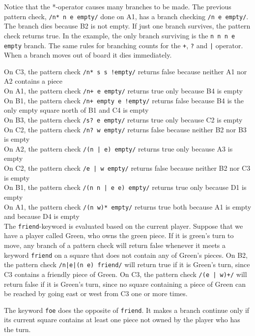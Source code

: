 Notice that the *-operator causes many branches to be made. The previous pattern check, \texttt{/n* n e empty/} done on A1, has a branch checking \texttt{/n e empty/}. The branch dies because B2 is not empty. If just one branch survives, the pattern check returns true. In the example, the only branch surviving is the \texttt{n n n e empty} branch. The same rules for branching counts for the \texttt{+}, \texttt{?} and \texttt{|} operator. When a branch moves out of board it dies immediately.

On C3, the pattern check \texttt{/n* s s !empty/} returns false because neither A1 nor A2 contains a piece\\
On A1, the pattern check \texttt{/n+ e empty/} returns true only because B4 is empty\\
On B1, the pattern check \texttt{/n+ empty e !empty/} returns false because B4 is the only empty square north of B1 and C4 is empty\\
On B3, the pattern check \texttt{/s? e empty/} returns true only because C2 is empty\\
On C2, the pattern check \texttt{/n? w empty/} returns false because neither B2 nor B3 is empty\\
On A2, the pattern check \texttt{/(n | e) empty/} returns true only because A3 is empty\\
On C2, the pattern check \texttt{/e | w empty/} returns false because neither B2 nor C3 is empty\\
On B1, the pattern check \texttt{/(n n | e e) empty/} returns true only because D1 is empty\\
On A1, the pattern check \texttt{/(n w)* empty/} returns true both because A1 is empty and because D4 is empty\\

The \texttt{friend}-keyword is evaluated based on the current player. Suppose that we have a player called Green, who owns the 
green piece. If it is green's turn to move, any branch of a pattern check will return false
whenever it meets a keyword \texttt{friend} on a square that does not contain any of Green's pieces.
On B2, the pattern check \texttt{/n|e|(n e) friend/} will return true if it is Green's turn, since C3 contains a friendly piece of Green.
On C3, the pattern check \texttt{/(e | w)+/} will return false if it is Green's turn, since no square containing a piece of Green can be reached by going east or west from C3 one or more times.

The keyword \texttt{foe} does the opposite of \texttt{friend}. It makes a branch continue only if its current square contains at least one piece not owned by the player who has the turn.

